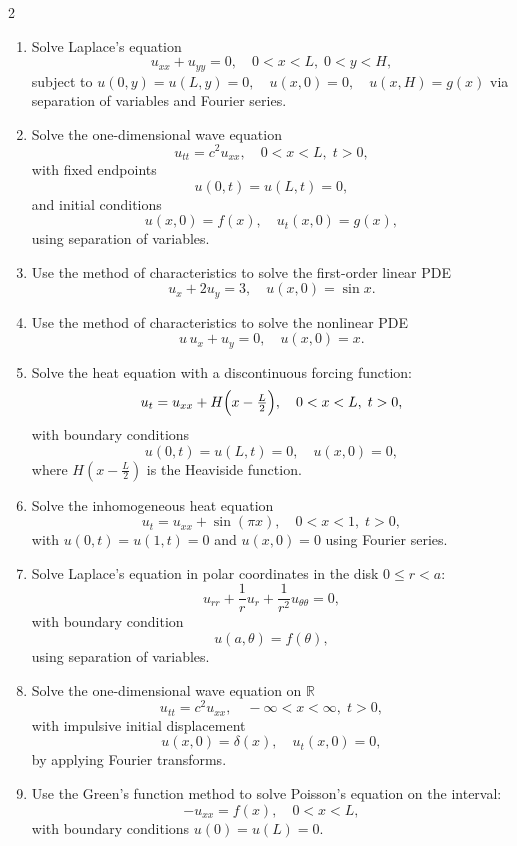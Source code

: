 \begin{multicols}{2}
\begin{enumerate}
  \item Solve Laplace's equation
    \[
    u_{xx}+u_{yy}=0,\quad 0<x<L,\;0<y<H,
    \]
    subject to $u(0,y)=u(L,y)=0,\quad u(x,0)=0,\quad u(x,H)=g(x) $
    via separation of variables and Fourier series.

  \item Solve the one-dimensional wave equation
    \[
    u_{tt}=c^2u_{xx},\quad 0<x<L,\;t>0,
    \]
    with fixed endpoints
    \[
    u(0,t)=u(L,t)=0,
    \]
    and initial conditions
    \[
    u(x,0)=f(x),\quad u_t(x,0)=g(x),
    \]
    using separation of variables.

  \item Use the method of characteristics to solve the first-order linear PDE
    \[
    u_x+2u_y=3,\quad u(x,0)=\sin x.
    \]

  \item Use the method of characteristics to solve the nonlinear PDE
    \[
    u\,u_x+u_y=0,\quad u(x,0)=x.
    \]

  \item Solve the heat equation with a discontinuous forcing function:
    \[
    u_t=u_{xx}+H\Bigl(x-\tfrac{L}{2}\Bigr),\quad 0<x<L,\;t>0,
    \]
    with boundary conditions
    \[
    u(0,t)=u(L,t)=0,\quad u(x,0)=0,
    \]
    where \(H(x-\tfrac{L}{2})\) is the Heaviside function.

  \item Solve the inhomogeneous heat equation
    \[
    u_t=u_{xx}+\sin(\pi x),\quad 0<x<1,\;t>0,
    \]
    with \(u(0,t)=u(1,t)=0\) and \(u(x,0)=0\) using Fourier series.

  \item Solve Laplace's equation in polar coordinates in the disk \(0\le r<a\):
    \[
    u_{rr}+\frac{1}{r}u_r+\frac{1}{r^2}u_{\theta\theta}=0,
    \]
    with boundary condition
    \[
    u(a,\theta)=f(\theta),
    \]
    using separation of variables.

  \item Solve the one-dimensional wave equation on \(\mathbb{R}\)
    \[
    u_{tt}=c^2u_{xx},\quad -\infty<x<\infty,\;t>0,
    \]
    with impulsive initial displacement
    \[
    u(x,0)=\delta(x),\quad u_t(x,0)=0,
    \]
    by applying Fourier transforms.

  \item Use the Green's function method to solve Poisson's equation on the interval:
    \[
    -u_{xx}=f(x),\quad 0<x<L,
    \]
    with boundary conditions \(u(0)=u(L)=0\).


\end{enumerate}
\end{multicols}
